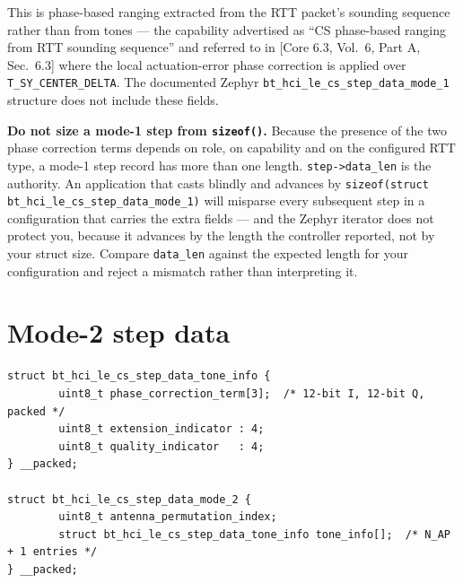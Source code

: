 \documentclass[11pt,a4paper]{article}
\newcommand{\code}[1]{\texttt{\small #1}}
\newcommand{\core}[1]{\textcolor{rulegrey}{\small[Core 6.3, #1]}}
\begin{document}
This is phase-based ranging extracted from the RTT packet's sounding sequence rather than from tones
--- the capability advertised as ``CS phase-based ranging from RTT sounding sequence'' and referred to
in \core{Vol.\ 6, Part A, Sec.\ 6.3} where the local actuation-error phase correction is applied over
\code{T\_\allowbreak{}SY\_\allowbreak{}CENTER\_\allowbreak{}DELTA}. The documented Zephyr \code{bt\_\allowbreak{}hci\_\allowbreak{}le\_\allowbreak{}cs\_\allowbreak{}step\_\allowbreak{}data\_\allowbreak{}mode\_\allowbreak{}1}
structure does not include these fields.

\begin{caution}
\textbf{Do not size a mode-1 step from \code{sizeof()}.} Because the presence of the two phase
correction terms depends on role, on capability and on the configured RTT type, a mode-1 step record
has more than one length. \code{step->data\_\allowbreak{}len} is the authority. An application that casts blindly
and advances by \code{sizeof(struct bt\_\allowbreak{}hci\_\allowbreak{}le\_\allowbreak{}cs\_\allowbreak{}step\_\allowbreak{}data\_\allowbreak{}mode\_\allowbreak{}1)} will misparse every
subsequent step in a configuration that carries the extra fields --- and the Zephyr iterator does not
protect you, because it advances by the length the controller reported, not by your struct size.
Compare \code{data\_\allowbreak{}len} against the expected length for your configuration and reject a mismatch
rather than interpreting it.
\end{caution}
\section{Mode-2 step data}
\label{sec:mode2}

\begin{lstlisting}
struct bt_hci_le_cs_step_data_tone_info {
        uint8_t phase_correction_term[3];  /* 12-bit I, 12-bit Q, packed */
        uint8_t extension_indicator : 4;
        uint8_t quality_indicator   : 4;
} __packed;

struct bt_hci_le_cs_step_data_mode_2 {
        uint8_t antenna_permutation_index;
        struct bt_hci_le_cs_step_data_tone_info tone_info[];  /* N_AP + 1 entries */
} __packed;
\end{lstlisting}
\end{document}
